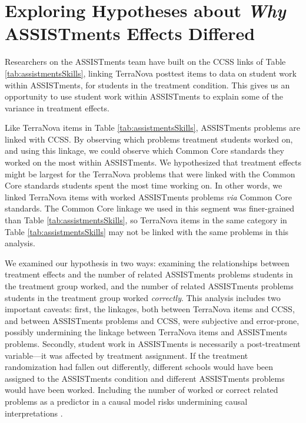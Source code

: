 \documentclass{edm_article}
\begin{document}
\section{Exploring Hypotheses about \emph{Why} ASSISTments Effects Differed}\label{sec:hypotheses}
Researchers on the ASSISTments team have built on the CCSS links of
Table \ref{tab:assistmentsSkills}, linking TerraNova posttest items to
data on student work within ASSISTments, for students in the treatment
condition.
This gives us an opportunity to use student work within ASSISTments to
explain some of the variance in treatment effects.

Like TerraNova items in Table \ref{tab:assistmentsSkills}, ASSISTments
problems are linked with CCSS.
By observing which problems treatment students worked on, and using this
linkage, we could observe which Common Core standards they worked on
the most within ASSISTments.
We hypothesized that treatment effects might be largest for the
TerraNova problems that were linked with the Common Core standards
students spent the most time working on.
In other words, we linked TerraNova items with worked ASSISTments
problems \emph{via} Common Core standards.
The Common Core linkage we used in this segment was finer-grained than
Table \ref{tab:assistmentsSkills}, so TerraNova items in the same
category in Table \ref{tab:assistmentsSkills} may not be linked with
the same problems in this analysis.

We examined our hypothesis in two ways: examining the relationships
between treatment effects and the number of related ASSISTments
problems students in the treatment group worked, and the number of
related ASSISTments problems students in the treatment group worked
\emph{correctly}. 
This analysis includes two important caveats: first, the linkages,
both between TerraNova items and CCSS, and between ASSISTments
problems and CCSS, were subjective and error-prone, possibly
undermining the linkage between TerraNova items and ASSISTments
problems. 
Secondly, student work in ASSISTments is necessarily a post-treatment
variable---it was affected by treatment assignment.
If the treatment randomization had fallen out differently, different
schools would have been assigned to the ASSISTments condition and
different ASSISTments problems would have been worked.
Including the number of worked or correct related problems as a
predictor in a causal model risks undermining causal interpretations
\cite{montgomery2018conditioning}.
\end{document}
